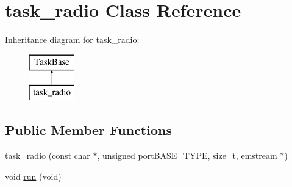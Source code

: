 \hypertarget{classtask__radio}{}\section{task\+\_\+radio Class Reference}
\label{classtask__radio}
Inheritance diagram for task\+\_\+radio\+:\begin{figure}[H]
\begin{center}
\leavevmode
\includegraphics[height=2.000000cm]{classtask__radio}
\end{center}
\end{figure}
\subsection*{Public Member Functions}
\begin{DoxyCompactItemize}
\item 
\mbox{\hyperlink{classtask__radio_ad6d6a721a2642bb3074d682ea880aa30}{task\+\_\+radio}} (const char $\ast$, unsigned port\+B\+A\+S\+E\+\_\+\+T\+Y\+PE, size\+\_\+t, emstream $\ast$)
\item 
void \mbox{\hyperlink{classtask__radio_a4aeed57265c3fd031bd1219a9854811d}{run}} (void)
\end{DoxyCompactItemize}
